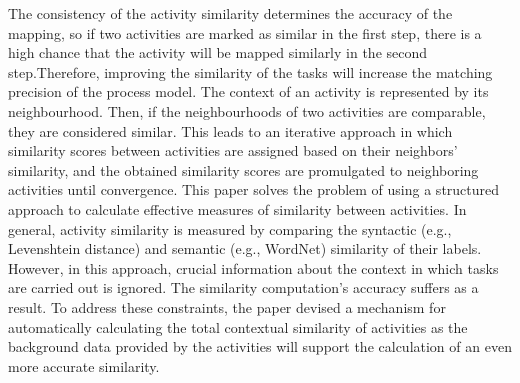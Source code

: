 \documentclass[runningheads]{llncs}
\begin{document}
The consistency of the activity similarity determines the accuracy of the mapping, so if two activities are marked as similar in the first step, there is a high chance that the activity will be mapped similarly in the second step\cite{ref6}.Therefore, improving the similarity of the tasks will increase the matching precision of the process model. The context of an activity is represented by its neighbourhood. Then, if the neighbourhoods of two activities are comparable, they are considered similar. This leads to an iterative approach in which similarity scores between activities are assigned based on their neighbors’ similarity\cite{ref8}, and the obtained similarity scores are promulgated to neighboring activities until convergence. This paper solves the problem of using a structured approach to calculate effective measures of similarity between activities. In general, activity similarity is measured by comparing the syntactic (e.g., Levenshtein distance) and semantic (e.g., WordNet) similarity of their labels. However, in this approach, crucial information about the context in which tasks are carried out is ignored. The similarity computation's accuracy suffers as a result. To address these constraints, the paper devised a mechanism for automatically calculating the total contextual similarity of activities as the background data provided by the activities will support the calculation of an even more accurate similarity. %
\end{document}
